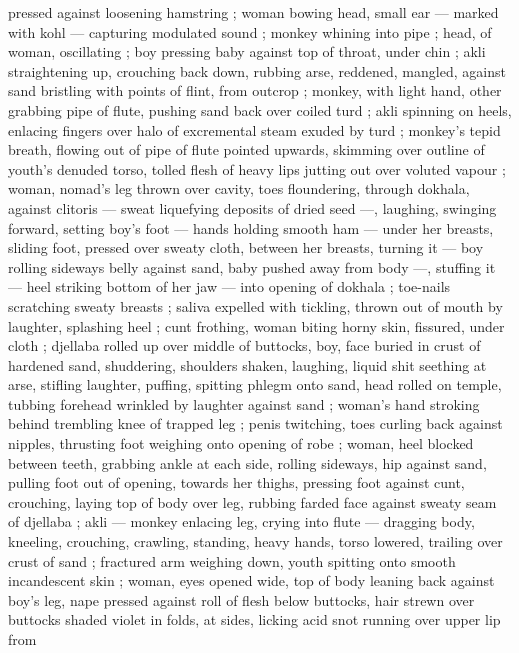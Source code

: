 {pressed against loosening hamstring ; woman bowing head, small ear 
--- marked with kohl --- capturing modulated sound ; monkey 
whining into pipe ; head, of woman, oscillating ; boy pressing baby 
against top of throat, under chin ; akli straightening up, crouching 
back down, rubbing arse, reddened, mangled, against sand bristling 
with points of flint, from outcrop ; monkey, with light hand, other 
grabbing pipe of flute, pushing sand back over coiled turd ; akli 
spinning on heels, enlacing fingers over halo of excremental steam 
exuded by turd ; monkey's tepid breath, flowing out of pipe of flute 
pointed upwards, skimming over outline of youth's denuded torso, 
tolled flesh of heavy lips jutting out over voluted vapour ; woman, 
nomad's leg thrown over cavity, toes floundering, through dokhala, 
against clitoris --- sweat liquefying deposits of dried seed ---, 
laughing, swinging forward, setting boy's foot --- hands holding 
smooth ham --- under her breasts, sliding foot, pressed over sweaty 
cloth, between her breasts, turning it --- boy rolling sideways belly 
against sand, baby pushed away from body ---, stuffing it --- heel 
striking bottom of her jaw --- into opening of dokhala ; toe-nails 
scratching sweaty breasts ; saliva expelled with tickling, thrown out 
of mouth by laughter, splashing heel ; cunt frothing, woman biting 
horny skin, fissured, under cloth ; djellaba rolled up over middle of 
buttocks, boy, face buried in crust of hardened sand, shuddering, 
shoulders shaken, laughing, liquid shit seething at arse, stifling 
laughter, puffing, spitting phlegm onto sand, head rolled on temple, 
tubbing forehead wrinkled by laughter against sand ; woman's hand 
stroking behind trembling knee of trapped leg ; penis twitching, toes 
curling back against nipples, thrusting foot weighing onto opening of 
robe ; woman, heel blocked between teeth, grabbing ankle at each 
side, rolling sideways, hip against sand, pulling foot out of opening, 
towards her thighs, pressing foot against cunt, crouching, laying top 
of body over leg, rubbing farded face against sweaty seam of 
djellaba ; akli --- monkey enlacing leg, crying into flute --- dragging 
body, kneeling, crouching, crawling, standing, heavy hands, torso 
lowered, trailing over crust of sand ; fractured arm weighing down, 
youth spitting onto smooth incandescent skin ; woman, eyes opened 
wide, top of body leaning back against boy's leg, nape pressed 
against roll of flesh below buttocks, hair strewn over buttocks shaded 
violet in folds, at sides, licking acid snot running over upper lip from 
}
